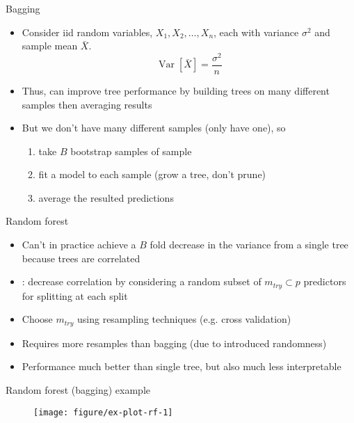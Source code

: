 \documentclass{beamer}
\begin{document}
\begin{frame}{Bagging}
  
  \begin{itemize}[<+->]
    \item Consider iid random variables, $X_{1}, X_{2}, \ldots, X_{n}$, each with variance $\sigma^2$ and sample mean $\bar{X}$.
  \begin{equation*}
    \operatorname{Var}[\bar{X}] = \frac{\sigma^2}{n}
  \end{equation*}
  \item Thus, can improve tree performance by building trees on many different samples then averaging results
  \item But we don't have many different samples (only have one), so
  \begin{enumerate}
    \item take $B$ bootstrap samples of sample
    \item fit a model to each sample (grow a tree, don't prune)
    \item average the resulted predictions 
  \end{enumerate}
  \end{itemize}
  
\end{frame}

\begin{frame}{Random forest}
  
  \begin{itemize}[<+->]
    \item Can't in practice achieve a $B$ fold decrease in the variance from a single tree because trees are correlated
    \item \textcite{rf}: decrease correlation by considering a random subset of $m_{try} \subset p$ predictors for splitting at each split
    \item Choose $m_{try}$ using resampling techniques (e.g. cross validation)
    \item Requires more resamples than bagging (due to introduced randomness)
    \item Performance much better than single tree, but also much less interpretable 
  \end{itemize}
\end{frame}

\begin{frame}{Random forest (bagging) example}
  
  \begin{figure}[!htb]
  \begin{center}
    \texttt{[image: figure/ex-plot-rf-1]}
  \end{center}
  \end{figure}
  
\end{frame}
\end{document}
